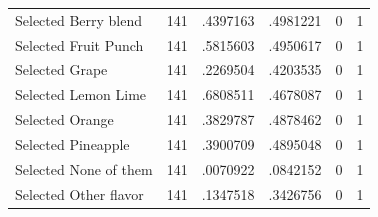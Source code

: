 \begin{table}[htbp]
\begin{tabular}{l*{1}{ccccc}}
Selected Berry blend&         141&    .4397163&    .4981221&           0&           1\\
Selected Fruit Punch&         141&    .5815603&    .4950617&           0&           1\\
Selected Grape      &         141&    .2269504&    .4203535&           0&           1\\
Selected Lemon Lime &         141&    .6808511&    .4678087&           0&           1\\
Selected Orange     &         141&    .3829787&    .4878462&           0&           1\\
Selected Pineapple  &         141&    .3900709&    .4895048&           0&           1\\
Selected None of them&         141&    .0070922&    .0842152&           0&           1\\
Selected Other flavor&         141&    .1347518&    .3426756&           0&           1\\
\hline\hline
\end{tabular}
\end{table}
